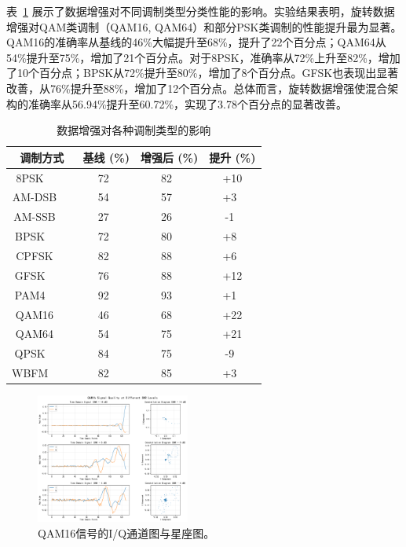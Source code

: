 \documentclass[conference]{IEEEtran}
\begin{document}
表~\ref{tab:data_augmentation_results} 展示了数据增强对不同调制类型分类性能的影响。实验结果表明，旋转数据增强对QAM类调制（QAM16, QAM64）和部分PSK类调制的性能提升最为显著。QAM16的准确率从基线的46\%大幅提升至68\%，提升了22个百分点；QAM64从54\%提升至75\%，增加了21个百分点。对于8PSK，准确率从72\%上升至82\%，增加了10个百分点；BPSK从72\%提升至80\%，增加了8个百分点。GFSK也表现出显著改善，从76\%提升至88\%，增加了12个百分点。总体而言，旋转数据增强使混合架构的准确率从56.94\%提升至60.72\%，实现了3.78个百分点的显著改善。

\begin{table}[!htbp]
\centering
\caption{数据增强对各种调制类型的影响}
\label{tab:data_augmentation_results}
\begin{tabular}{@{}cccc@{}}
\toprule
调制方式 & 基线 (\%) & 增强后 (\%) & 提升 (\%) \\
\midrule
8PSK     & 72  & 82  & +10 \\
AM-DSB   & 54  & 57  & +3  \\
AM-SSB   & 27  & 26  & -1  \\
BPSK     & 72  & 80  & +8  \\
CPFSK    & 82  & 88  & +6  \\
GFSK     & 76  & 88  & +12 \\
PAM4     & 92  & 93  & +1  \\
QAM16    & 46  & 68  & +22 \\
QAM64    & 54  & 75  & +21 \\
QPSK     & 84  & 75  & -9  \\
WBFM     & 82  & 85  & +3  \\
\bottomrule
\end{tabular}
\end{table}

\begin{figure}[htbp]
\centering
\includegraphics[width=0.45\textwidth]{figure/QAM16_rotation.png}
\caption{QAM16信号的I/Q通道图与星座图。}
\label{fig:rotation_augmentation}
\end{figure}
\end{document}
